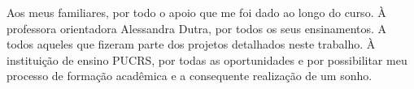 \begin{agradecimentos}
  Aos meus familiares, por todo o apoio que me foi dado ao longo do curso. À professora orientadora Alessandra Dutra, por todos os seus ensinamentos. A todos aqueles que fizeram parte dos projetos detalhados neste trabalho. À instituição de ensino PUCRS, por todas as oportunidades e por possibilitar meu processo de formação acadêmica e a consequente realização de um sonho.
\vfill
\end{agradecimentos}